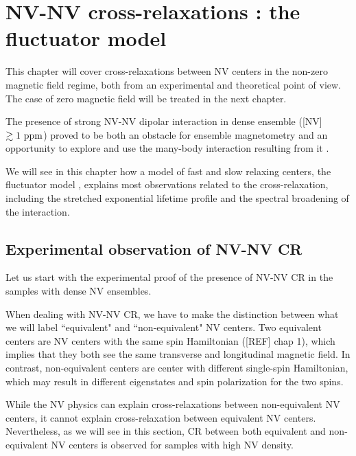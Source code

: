 \documentclass[a4paper,11pt]{report}
\title{}
\begin{document}
\chapter{NV-NV cross-relaxations : the fluctuator model}
This chapter will cover cross-relaxations between NV centers in the non-zero magnetic field regime, both from an experimental and theoretical point of view. The case of zero magnetic field will be treated in the next chapter.

The presence of strong NV-NV dipolar interaction in dense ensemble ([NV] $\gtrsim 1\ \rm ppm$) proved to be both an obstacle for ensemble magnetometry \citep{zhou2020quantum} and an opportunity to explore and use the many-body interaction resulting from it \citep{zhou2020quantum, choi2017observation, kucsko2018critical, zu2021emergent}.

We will see in this chapter how a model of fast and slow relaxing centers, the fluctuator model \citep{choi2017depolarization}, explains most observations related to the cross-relaxation, including the stretched exponential lifetime profile and the spectral broadening of the interaction.

\section{Experimental observation of NV-NV CR}
Let us start with the experimental proof of the presence of NV-NV CR in the samples with dense NV ensembles.

When dealing with NV-NV CR, we have to make the distinction between what we will label ``equivalent" and ``non-equivalent" NV centers. Two equivalent centers are NV centers with the same spin Hamiltonian ([REF] chap 1), which implies that they both see the same transverse and longitudinal magnetic field. In contrast, non-equivalent centers are center with different single-spin Hamiltonian, which may result in different eigenstates and spin polarization for the two spins.

While the NV physics can explain cross-relaxations between non-equivalent NV centers, it cannot explain cross-relaxation between equivalent NV centers. Nevertheless, as we will see in this section, CR between both equivalent and non-equivalent NV centers is observed for samples with high NV density. 
\end{document}
